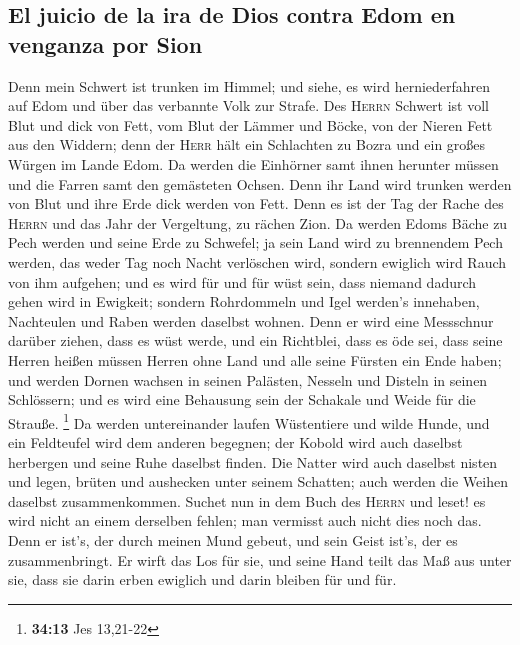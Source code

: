 \hypertarget{el-juicio-de-la-ira-de-dios-contra-edom-en-venganza-por-sion}{%
\subsection{El juicio de la ira de Dios contra Edom en venganza por
Sion}\label{el-juicio-de-la-ira-de-dios-contra-edom-en-venganza-por-sion}}

 Denn mein Schwert ist trunken im Himmel; und siehe, es
wird herniederfahren auf Edom und über das verbannte Volk zur Strafe.
 Des \textsc{Herrn} Schwert ist voll Blut und dick von
Fett, vom Blut der Lämmer und Böcke, von der Nieren Fett aus den
Widdern; denn der \textsc{Herr} hält ein Schlachten zu Bozra und ein
großes Würgen im Lande Edom.  Da werden die Einhörner samt
ihnen herunter müssen und die Farren samt den gemästeten Ochsen. Denn
ihr Land wird trunken werden von Blut und ihre Erde dick werden von
Fett.  Denn es ist der Tag der Rache des \textsc{Herrn}
und das Jahr der Vergeltung, zu rächen Zion.  Da werden
Edoms Bäche zu Pech werden und seine Erde zu Schwefel; ja sein Land wird
zu brennendem Pech werden,  das weder Tag noch Nacht
verlöschen wird, sondern ewiglich wird Rauch von ihm aufgehen; und es
wird für und für wüst sein, dass niemand dadurch gehen wird in Ewigkeit;
 sondern Rohrdommeln und Igel werden's innehaben,
Nachteulen und Raben werden daselbst wohnen. Denn er wird eine
Messschnur darüber ziehen, dass es wüst werde, und ein Richtblei, dass
es öde sei,  dass seine Herren heißen müssen Herren ohne
Land und alle seine Fürsten ein Ende haben;  und werden
Dornen wachsen in seinen Palästen, Nesseln und Disteln in seinen
Schlössern; und es wird eine Behausung sein der Schakale und Weide für
die Strauße. \footnote{\textbf{34:13} Jes 13,21-22}  Da
werden untereinander laufen Wüstentiere und wilde Hunde, und ein
Feldteufel wird dem anderen begegnen; der Kobold wird auch daselbst
herbergen und seine Ruhe daselbst finden.  Die Natter
wird auch daselbst nisten und legen, brüten und aushecken unter seinem
Schatten; auch werden die Weihen daselbst zusammenkommen.
 Suchet nun in dem Buch des \textsc{Herrn} und leset! es
wird nicht an einem derselben fehlen; man vermisst auch nicht dies noch
das. Denn er ist's, der durch meinen Mund gebeut, und sein Geist ist's,
der es zusammenbringt.  Er wirft das Los für sie, und
seine Hand teilt das Maß aus unter sie, dass sie darin erben ewiglich
und darin bleiben für und für.

